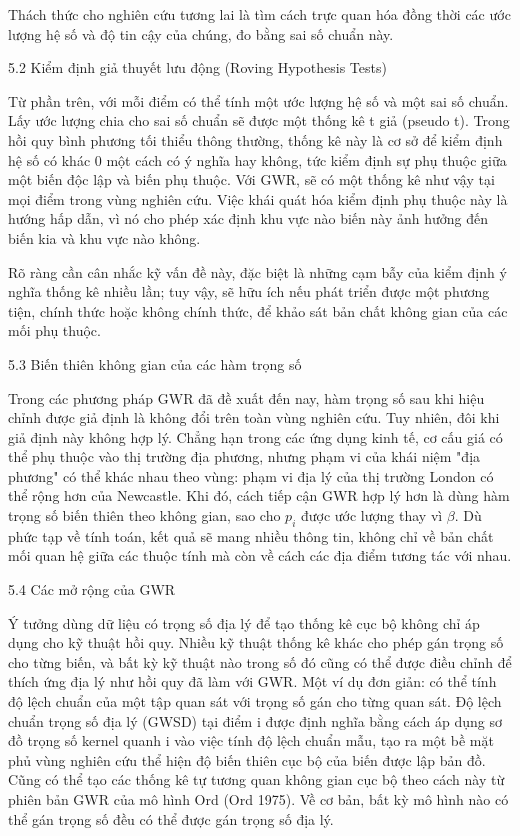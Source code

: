 Thách thức cho nghiên cứu tương lai là tìm cách trực quan hóa đồng thời các ước lượng hệ số và độ tin cậy của chúng, đo bằng sai số chuẩn này.

5.2 Kiểm định giả thuyết lưu động (Roving Hypothesis Tests)

Từ phần trên, với mỗi điểm có thể tính một ước lượng hệ số và một sai số chuẩn. Lấy ước lượng chia cho sai số chuẩn sẽ được một thống kê t giả (pseudo t). Trong hồi quy bình phương tối thiểu thông thường, thống kê này là cơ sở để kiểm định hệ số có khác 0 một cách có ý nghĩa hay không, tức kiểm định sự phụ thuộc giữa một biến độc lập và biến phụ thuộc. Với GWR, sẽ có một thống kê như vậy tại mọi điểm trong vùng nghiên cứu. Việc khái quát hóa kiểm định phụ thuộc này là hướng hấp dẫn, vì nó cho phép xác định khu vực nào biến này ảnh hưởng đến biến kia và khu vực nào không.

Rõ ràng cần cân nhắc kỹ vấn đề này, đặc biệt là những cạm bẫy của kiểm định ý nghĩa thống kê nhiều lần; tuy vậy, sẽ hữu ích nếu phát triển được một phương tiện, chính thức hoặc không chính thức, để khảo sát bản chất không gian của các mối phụ thuộc.

5.3 Biến thiên không gian của các hàm trọng số

Trong các phương pháp GWR đã đề xuất đến nay, hàm trọng số sau khi hiệu chỉnh được giả định là không đổi trên toàn vùng nghiên cứu. Tuy nhiên, đôi khi giả định này không hợp lý. Chẳng hạn trong các ứng dụng kinh tế, cơ cấu giá có thể phụ thuộc vào thị trường địa phương, nhưng phạm vi của khái niệm "địa phương" có thể khác nhau theo vùng: phạm vi địa lý của thị trường London có thể rộng hơn của Newcastle. Khi đó, cách tiếp cận GWR hợp lý hơn là dùng hàm trọng số biến thiên theo không gian, sao cho \(p_i\) được ước lượng thay vì \(\beta\). Dù phức tạp về tính toán, kết quả sẽ mang nhiều thông tin, không chỉ về bản chất mối quan hệ giữa các thuộc tính mà còn về cách các địa điểm tương tác với nhau.

5.4 Các mở rộng của GWR

Ý tưởng dùng dữ liệu có trọng số địa lý để tạo thống kê cục bộ không chỉ áp dụng cho kỹ thuật hồi quy. Nhiều kỹ thuật thống kê khác cho phép gán trọng số cho từng biến, và bất kỳ kỹ thuật nào trong số đó cũng có thể được điều chỉnh để thích ứng địa lý như hồi quy đã làm với GWR. Một ví dụ đơn giản: có thể tính độ lệch chuẩn của một tập quan sát với trọng số gán cho từng quan sát. Độ lệch chuẩn trọng số địa lý (GWSD) tại điểm i được định nghĩa bằng cách áp dụng sơ đồ trọng số kernel quanh i vào việc tính độ lệch chuẩn mẫu, tạo ra một bề mặt phủ vùng nghiên cứu thể hiện độ biến thiên cục bộ của biến được lập bản đồ. Cũng có thể tạo các thống kê tự tương quan không gian cục bộ theo cách này từ phiên bản GWR của mô hình Ord (Ord 1975). Về cơ bản, bất kỳ mô hình nào có thể gán trọng số đều có thể được gán trọng số địa lý.

